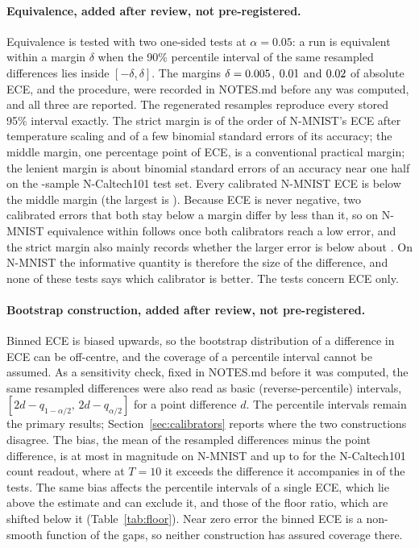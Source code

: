 \documentclass[10pt]{article}
\begin{document}
\paragraph{Equivalence, added after review, not pre-registered.} Equivalence is tested with two
one-sided tests at $\alpha=0.05$: a run is equivalent within a margin $\delta$ when the 90\%
percentile interval of the same resampled differences lies inside $[-\delta,\delta]$. The margins
$\delta=0.005$, $0.01$ and $0.02$ of absolute ECE, and the procedure, were %
recorded in NOTES.md before any was computed, and all three are reported. The regenerated
resamples reproduce every stored 95\% interval exactly. The strict margin is of the order of
N-MNIST's ECE after temperature scaling and of a few binomial standard errors of its accuracy;
the middle margin, one percentage point of ECE, is a conventional practical margin; the lenient
margin is about \wideMarginSe{} binomial standard errors of an accuracy near one half on the %
\ncSplitTest-sample N-Caltech101 test set. Every calibrated N-MNIST ECE is below the middle margin (the largest is %
\maxCalEceNm). Because ECE is never negative, two calibrated errors that both stay below a margin
differ by less than it, so on N-MNIST equivalence within \deltaMid{} follows once both calibrators
reach a low error, and the strict margin also mainly records whether the larger error is below
about \deltaStrict. On N-MNIST the informative quantity is therefore the size of the difference,
and none of these tests says which calibrator is better. The tests concern ECE only.

\paragraph{Bootstrap construction, added after review, not pre-registered.} Binned ECE is biased
upwards, so the bootstrap distribution of a difference in ECE can be off-centre, and the coverage
of a percentile interval cannot be assumed. As a sensitivity check, fixed in NOTES.md before it
was computed, the same resampled differences were also read as basic (reverse-percentile)
intervals, $[2d-q_{1-\alpha/2},\,2d-q_{\alpha/2}]$ for a point difference $d$. The percentile
intervals remain the primary results; Section~\ref{sec:calibrators} reports where the two
constructions disagree. The bias, the mean of the resampled differences minus the point
difference, is at most \biasNmMax{} in magnitude on N-MNIST and up to \biasNcCountMax{} for the %
N-Caltech101 count readout, where at $T=10$ it exceeds the difference it accompanies in %
\biasExceedsTen{} of the \biasTestsTen{} tests. The same bias affects the percentile intervals of a
single ECE, which lie above the estimate and can exclude it, and those of the floor ratio, which
are shifted below it (Table~\ref{tab:floor}). Near zero error the binned ECE is a non-smooth
function of the gaps, so neither construction has assured coverage there.
\end{document}
